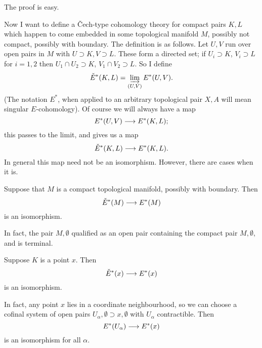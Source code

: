 \documentclass[../main]{subfiles}
\begin{document}
The proof is easy.

Now I want to define a \v{C}ech-type cohomology theory  for compact pairs $K,L$ which happen to come embedded in some topological manifold $M$, possibly not compact, possibly with boundary. The definition is as follows. Let $U,V$ run over open pairs in $M$ with $U \supset K, V \supset L$. These form a directed set; if $U_i \supset K$, $V_i \supset L$ for $i=1,2$ then $U_1 \cap U_2 \supset K$, $V_1 \cap V_2 \supset L$. So I define
\[\check{E}^*(K,L) = \varinjlim_{(U,V)} E^*(U,V).\]
(The notation $E^*$, when applied to an arbitrary topological pair $X,A$ will mean singular $E$-cohomology). Of course we will always have a map 
\[E^*(U,V) \longrightarrow E^*(K,L);\]
this passes to the limit, and gives us a map
\[\check{E}^*(K,L) \longrightarrow E^*(K,L).\]
In general this map need not be an isomorphism. However, there are cases when it is.
\begin{examples}[i]
Suppose that $M$ is a compact topological manifold, possibly with boundary. Then 
\[\check{E}^*(M) \longrightarrow E^*(M)\]
is an isomorphism.
\end{examples}
In fact, the pair $M,\emptyset$ qualified as an open pair containing the compact pair $M,\emptyset$, and is terminal.
\begin{examples}[ii]
Suppose $K$ is a point $x$. Then 
\[\check{E}^*(x) \longrightarrow E^*(x)\]
is an isomorphism.
\end{examples}

In fact, any point $x$ lies in a coordinate neighbourhood, so we can choose a cofinal system of open pairs $U_\alpha, \emptyset \supset x, \emptyset$ with $U_\alpha$ contractible. Then 
\[E^*(U_\alpha) \longrightarrow E^*(x)\]
is an isomorphism for all $\alpha$.
\end{document}
